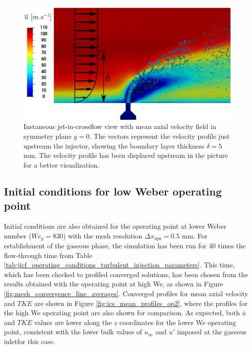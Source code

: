 \begin{figure}[ht]
\centering
\includegraphics[scale=0.3]{./part2_developments/figures_ch5_resolved_JICF/Umean_profile_with_jet_in_BL}
\caption[Instaneous jet-in-crossflow view with mean axial velocity field in symmetry plane $y = 0$]{Instaneous jet-in-crossflow view with mean axial velocity field in symmetry plane $y = 0$. The vectors represent the velocity profile just upstream the injector, showing the boundary layer thickness $\delta = 5$ mm. The velocity profile has been displaced upstream in the picture for a better visualization.}
\label{fig:Umean_profile_with_jet}
\end{figure}




\subsection{Initial conditions for low Weber operating point}

Initial conditions are also obtained for the operating point at lower Weber number ($We_g = 830$) with the mesh resolution $\Delta x_\mathrm{ups} = 0.5$ mm. For establishment of the gaseous phase, the simulation has been run for 40 times the flow-through time from Table \ref{tab:jicf_operating_conditions_turbulent_injection_parameters}. This time, which has been checked to profiled converged solutions, has been chosen from the results obtained with the operating point at high We, as shown in Figure \ref{fig:mesh_convergence_line_averages}. Converged profiles for mean axial velocity and $TKE$ are shown in Figure \ref{fig:ics_mean_profiles_op2}, where the profiles for the high We operating point are also shown for comparison. As expected, both $\overline{u}$ and $TKE$ values are lower along the $z$ coordinates for the lower We operating point, consistent with the lower bulk values of $u_\infty$ and $u'$ imposed at the gaseous inletfor this case.

